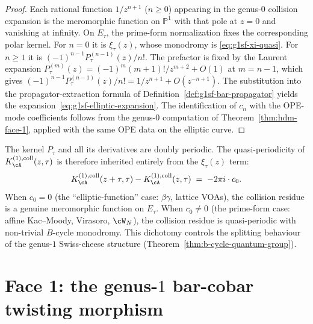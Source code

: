 \begin{proof}
Each rational function $1/z^{n+1}$ ($n \geq 0$) appearing in the
genus-$0$ collision expansion is the meromorphic function on
$\mathbb{P}^1$ with that pole at $z=0$ and vanishing at infinity. On
$E_\tau$, the prime-form normalization fixes the corresponding polar
kernel. For $n=0$ it is $\xi_\tau(z)$, whose monodromy is
\eqref{eq:g1sf-xi-quasi}. For $n\geq1$ it is
$(-1)^{n-1}P_\tau^{(n-1)}(z)/n!$. The prefactor is fixed by the
Laurent expansion
$P_\tau^{(m)}(z)=(-1)^m(m+1)!/z^{m+2}+O(1)$ at $m=n-1$, which gives
$(-1)^{n-1}P_\tau^{(n-1)}(z)/n! = 1/z^{n+1}+O(z^{-n+1})$.
The substitution into the propagator-extraction formula of
Definition~\ref{def:g1sf-bar-propagator} yields the
expansion~\eqref{eq:g1sf-elliptic-expansion}. The identification of
$c_n$ with the OPE-mode coefficients follows from the genus-$0$
computation of Theorem~\ref{thm:hdm-face-1}, applied with the same
OPE data on the elliptic curve.
\end{proof}

\begin{remark}
\label{rem:g1sf-dichotomy}
The kernel $P_\tau$ and all its derivatives are doubly periodic.
The quasi-periodicity of $K_\cA^{(1),\mathrm{coll}}(z,\tau)$ is therefore inherited
entirely from the $\xi_\tau(z)$ term:
\begin{equation}\label{eq:g1sf-B-cycle-monodromy}
K_\cA^{(1),\mathrm{coll}}(z+\tau,\tau)
-K_\cA^{(1),\mathrm{coll}}(z,\tau)
\;=\;
-2\pi i \cdot c_0.
\end{equation}
When $c_0 = 0$ (the ``elliptic-function'' case: $\beta\gamma$, lattice
VOAs), the collision residue is a genuine meromorphic function on
$E_\tau$. When $c_0 \neq 0$ (the prime-form case: affine
Kac--Moody, Virasoro, $\cW_N$), the collision residue is
quasi-periodic with non-trivial $B$-cycle monodromy. This dichotomy
controls the splitting behaviour of the genus-$1$ Swiss-cheese
structure (Theorem~\ref{thm:b-cycle-quantum-group}).
\end{remark}



\section{Face 1: the genus-$1$ bar-cobar twisting morphism}
\label{sec:g1sf-face-1}

